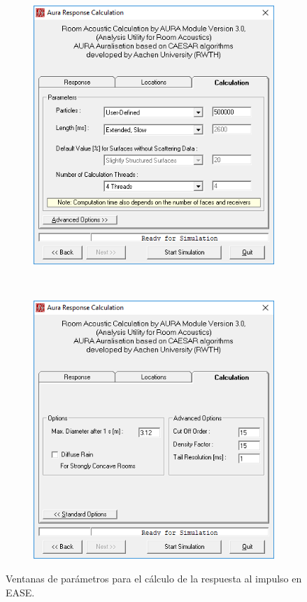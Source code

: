 \begin{figure}[ht]
    \centering
    \begin{subfigure}[b]{0.47\textwidth}
    	\centering
        \includegraphics[width=0.95\linewidth]{archivos/capturas/easeopciones1.png}
    \end{subfigure}
    ~ %
    \begin{subfigure}[b]{0.47\textwidth}
    	\centering
        \includegraphics[width=0.95\linewidth]{archivos/capturas/easeopciones2.png}
    \end{subfigure}
    \caption{Ventanas de parámetros para el cálculo de la respuesta al impulso en EASE.}\label{opcionesease}
\end{figure}
\FloatBarrier 


